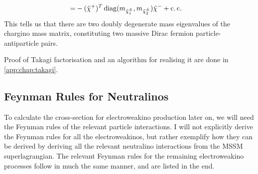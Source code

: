 \documentclass[../main.tex]{subfiles}
\begin{document}
\begin{align}
  =                                 & -(\tilde\chi^+)^T \operatorname{diag}(m_{\tilde\chi^\pm_1}, m_{\tilde\chi^\pm_2}) \tilde\chi^- + \operatorname{c.c.}
\end{align}
This tells us that there are two doubly degenerate mass eigenvalues of the chargino mass matrix, constituting two massive Dirac fermion particle-antiparticle pairs.

Proof of Takagi factorisation and an algorithm for realising it are done in \cref{app:chap:takagi}.




\subsection{Feynman Rules for Neutralinos}
\label{susy:sec:feynman_rules}
To calculate the cross-section for electroweakino production later on, we will need the Feynman rules of the relevant particle interactions.
I will not explicitly derive the Feynman rules for all the electroweakinos, but rather exemplify how they can be derived by deriving all the relevant neutralino interactions from the MSSM superlagrangian.
The relevant Feynman rules for the remaining electroweakino processes follow in much the same manner, and are listed in the end.
\end{document}
